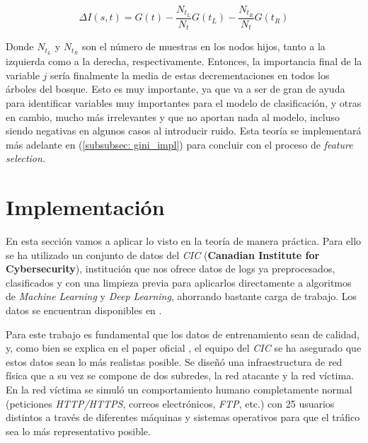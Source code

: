 \documentclass[12pt]{article}
\numberwithin{equation}{section} %
\begin{document}
    \vspace{2.5mm}

    \begin{equation}
    \Delta I(s, t) = G(t) - \frac{N_{t_L}}{N_t} G(t_L) - \frac{N_{t_R}}{N_t} G(t_R)  
    \end{equation}

    \vspace{2.5mm}

    Donde $N_{t_L}$ y $N_{t_R}$ son el número de muestras en los nodos hijos, tanto a la izquierda como a la derecha, respectivamente. Entonces, la importancia final de la variable $j$ sería finalmente la media de estas decrementaciones en todos los árboles del bosque. Esto es muy importante, ya que va a ser de gran de ayuda para identificar variables muy importantes para el modelo de clasificación, y otras en cambio, mucho más irrelevantes y que no aportan nada al modelo, incluso siendo negativas en algunos casos al introducir ruido. Esta teoría se implementará más adelante en (\ref{subsubsec: gini_impl}) para concluir con el proceso de \textit{feature selection}.

    \vspace{10mm}





    \newpage
    \thispagestyle{empty}
    \mbox{}

    \section{Implementación}\label{sec: implementacion}

    \vspace{5mm}

    En esta sección vamos a aplicar lo visto en la teoría de manera práctica. Para ello se ha utilizado un conjunto de datos del \textit{CIC} (\textbf{Canadian Institute for Cybersecurity}), institución que nos ofrece datos de logs ya preprocesados, clasificados y con una limpieza previa para aplicarlos directamente a algoritmos de \textit{Machine Learning} y \textit{Deep Learning}, ahorrando bastante carga de trabajo. Los datos se encuentran disponibles en \cite{CICIDS2017}.

    \vspace{5mm}

    Para este trabajo es fundamental que los datos de entrenamiento sean de calidad, y, como bien se explica en el paper oficial \cite{CICIDS2017_paper}, el equipo del \textit{CIC} se ha asegurado que estos datos sean lo más realistas posible. Se diseñó una infraestructura de red física que a su vez se compone de dos subredes, la red atacante y la red víctima. En la red víctima se simuló un comportamiento humano completamente normal (peticiones \textit{HTTP/HTTPS}, correos electrónicos, \textit{FTP}, etc.) con 25 usuarios distintos a través de diferentes máquinas y sistemas operativos para que el tráfico sea lo más representativo posible.
\end{document}
